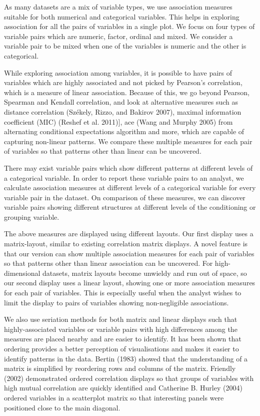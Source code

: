 As many datasets are a mix of variable types, we use association measures suitable for both numerical and categorical variables. This helps in exploring association for all the pairs of variables in a single plot. We focus on four types of variable pairs which are numeric, factor, ordinal and mixed. We consider a variable pair to be mixed when one of the variables is numeric and the other is categorical.

While exploring association among variables, it is possible to have pairs of variables which are highly associated and not picked by Pearson's correlation, which is a measure of linear association. Because of this, we go beyond Pearson, Spearman and Kendall correlation, and look at alternative measures such as distance correlation (Székely, Rizzo, and Bakirov 2007), maximal information coefficient (MIC) (Reshef et al. 2011){]}, ace (Wang and Murphy 2005) from alternating conditional expectations algorithm and more, which are capable of capturing non-linear patterns. We compare these multiple measures for each pair of variables so that patterns other than linear can be uncovered.

There may exist variable pairs which show different patterns at different levels of a categorical variable. In order to report these variable pairs to an analyst, we calculate association measures at different levels of a categorical variable for every variable pair in the dataset. On comparison of these measures, we can discover variable pairs showing different structures at different levels of the conditioning or grouping variable.

The above measures are displayed using different layouts. Our first display uses a matrix-layout, similar to existing correlation matrix displays. A novel feature is that our version can show multiple association measures for each pair of variables so that patterns other than linear association can be uncovered. For high-dimensional datasets, matrix layouts become unwieldy and run out of space, so our second display uses a linear layout, showing one or more association measures for each pair of variables. This is especially useful when the analyst wishes to limit the display to pairs of variables showing non-negligible associations.

We also use seriation methods for both matrix and linear displays such that highly-associated variables or variable pairs with high differences among the measures are placed nearby and are easier to identify. It has been shown that ordering provides a better perception of visualisations and makes it easier to identify patterns in the data. Bertin (1983) showed that the understanding of a matrix is simplified by reordering rows and columns of the matrix. Friendly (2002) demonstrated ordered correlation displays so that groups of variables with high mutual correlation are quickly identified and Catherine B. Hurley (2004) ordered variables in a scatterplot matrix so that interesting panels were positioned close to the main diagonal.

